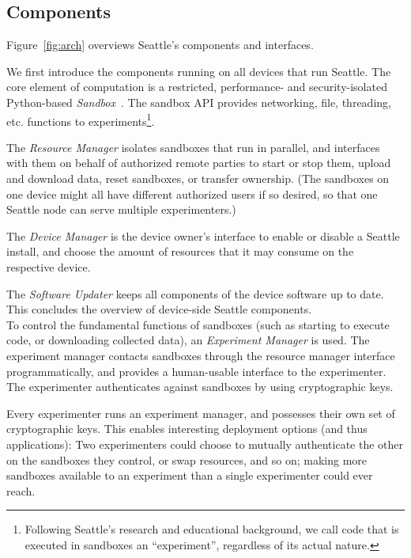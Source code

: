 \subsection{Components}

Figure~\ref{fig:arch} overviews Seattle's components and interfaces.

We first introduce the components running on all devices that
run Seattle.
The core element of computation is a restricted,
performance- and security-isolated Python-based
\textit{Sandbox}~\cite{RepySandbox,li2015fence}.
The sandbox \gls{API} provides
networking, file, threading, etc. functions to
experiments\footnote{
Following Seattle's research and educational background, we
call code that is executed in sandboxes an ``experiment'',
regardless of its actual nature.}.

The \textit{Resource Manager} isolates %
sandboxes that run in
parallel, and interfaces with them on behalf of authorized remote
parties to start or stop them, upload and download data, reset
sandboxes, or transfer ownership. (The sandboxes on one
device might all have different authorized users if so desired,
so that one Seattle node can serve multiple experimenters.)

The \textit{Device Manager} %
is the device owner's interface to enable or disable a Seattle
install, and choose the amount of resources that it may consume on the respective
device.

The \textit{Software Updater} keeps all components of the
device software up to date. This concludes the overview of
device-side Seattle components.
\\

To control the fundamental functions of sandboxes (such as
starting to execute code, or downloading collected data),
an \textit{Experiment Manager} %
is used. The experiment manager contacts sandboxes through the
resource manager interface programmatically, and provides a
human-usable interface to the experimenter. The experimenter
authenticates against sandboxes by using cryptographic keys.

Every experimenter runs an experiment manager, and possesses
their own set of cryptographic keys. This enables interesting
deployment options (and thus applications):
Two experimenters could choose to mutually authenticate the
other on the sandboxes they control, or swap resources, and
so on; making more sandboxes available to an experiment than
a single experimenter could ever reach.
\\

